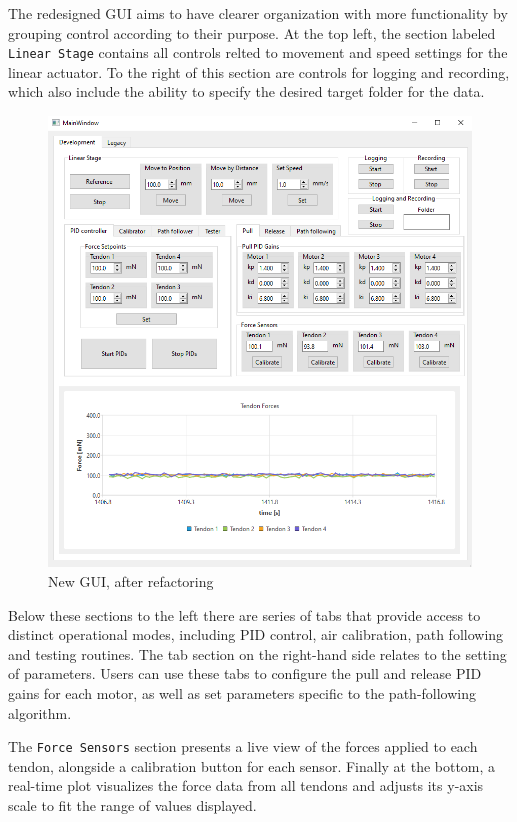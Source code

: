 The redesigned GUI aims to have clearer organization with more functionality by grouping control according to their purpose. At the top left, the section labeled \texttt{Linear Stage} contains all controls relted to movement and speed settings for the linear actuator. To the right of this section are controls for logging and recording, which also include the ability to specify the desired target folder for the data.
\begin{figure} [H]
    \centering
    \includegraphics[width=0.85\linewidth]{images/gui/main.PNG}
    \caption{New GUI, after refactoring}
    \label{fig:gui}
\end{figure}
Below these sections to the left there are series of tabs that provide access to distinct operational modes, including PID control, air calibration, path following and testing routines. The tab section on the right-hand side relates to the setting of parameters. Users can use these tabs to configure the pull and release PID gains for each motor, as well as set parameters specific to the path-following algorithm.

The \texttt{Force Sensors} section presents a live view of the forces applied to each tendon, alongside a calibration button for each sensor. Finally at the bottom, a real-time plot visualizes the force data from all tendons and adjusts its y-axis scale to fit the range of values displayed.


